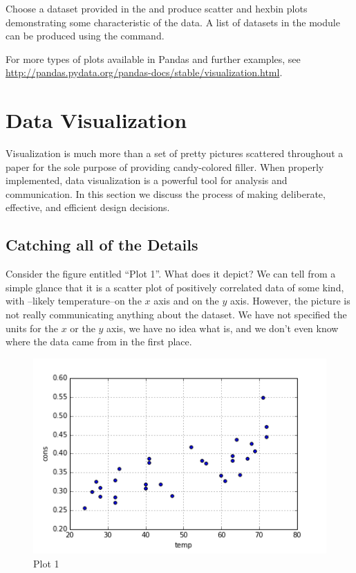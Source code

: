 \begin{problem}
Choose a dataset provided in the  and produce scatter and hexbin plots demonstrating some characteristic of the data. A list of datasets in the  module can be produced using the  command.
\end{problem}

For more types of plots available in Pandas and further examples, see \url{http://pandas.pydata.org/pandas-docs/stable/visualization.html}.

\section*{Data Visualization}

Visualization is much more than a set of pretty pictures scattered throughout a paper for the sole purpose of providing candy-colored filler.
When properly implemented, data visualization is a powerful tool for analysis and communication. 
In this section we discuss the process of making deliberate, effective, and efficient design decisions.

\subsection*{Catching all of the Details}

Consider the figure entitled ``Plot 1''. 
What does it depict?
We can tell from a simple glance that it is a scatter plot of positively correlated data of some kind, with --likely temperature--on the $x$ axis and  on the $y$ axis. 
However, the picture is not really communicating anything about the dataset. We have not specified the units for the $x$ or the $y$ axis, we have no idea what  is, and we don't even know where the data came from in the first place. 

\begin{figure}[H] 
    \centering
    \includegraphics[width=.75\textwidth]{Nolabels.png}
    \caption{Plot 1}
    \label{fig:aplot}
\end{figure}

